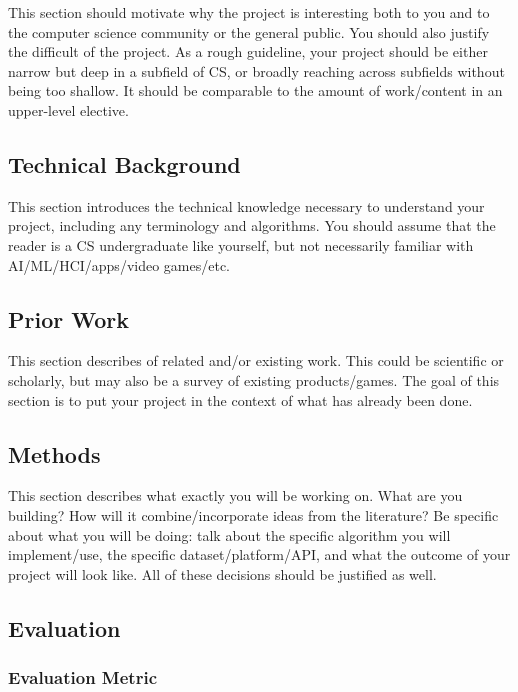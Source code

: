 \documentclass[10pt,twocolumn]{article}
\begin{document}
This section should motivate why the project is interesting both to you and to the computer science community or the general public.
You should also justify the difficult of the project.
As a rough guideline, your project should be either narrow but deep in a subfield of CS, or broadly reaching across subfields without being too shallow.
It should be comparable to the amount of work/content in an upper-level elective.

\subsection{Technical Background}

This section introduces the technical knowledge necessary to understand your project, including any terminology and algorithms.
You should assume that the reader is a CS undergraduate like yourself, but not necessarily familiar with AI/ML/HCI/apps/video games/etc. 

\subsection{Prior Work}

This section describes of related and/or existing work.
This could be scientific or scholarly, but may also be a survey of existing products/games.
The goal of this section is to put your project in the context of what has already been done.

\subsection{Methods}

This section describes what exactly you will be working on.
What are you building? How will it combine/incorporate ideas from the literature? Be specific about what you will be doing: talk about the specific algorithm you will implement/use, the specific dataset/platform/API, and what the outcome of your project will look like.
All of these decisions should be justified as well.

\subsection{Evaluation}

\subsubsection{Evaluation Metric}
\end{document}
